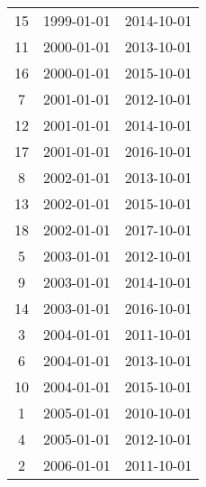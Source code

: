 % 
\begin{tabular}{ccc}
  \hline
  \hline
15 & 1999-01-01 & 2014-10-01 \\ 
  11 & 2000-01-01 & 2013-10-01 \\ 
  16 & 2000-01-01 & 2015-10-01 \\ 
  7 & 2001-01-01 & 2012-10-01 \\ 
  12 & 2001-01-01 & 2014-10-01 \\ 
  17 & 2001-01-01 & 2016-10-01 \\ 
  8 & 2002-01-01 & 2013-10-01 \\ 
  13 & 2002-01-01 & 2015-10-01 \\ 
  18 & 2002-01-01 & 2017-10-01 \\ 
  5 & 2003-01-01 & 2012-10-01 \\ 
  9 & 2003-01-01 & 2014-10-01 \\ 
  14 & 2003-01-01 & 2016-10-01 \\ 
  3 & 2004-01-01 & 2011-10-01 \\ 
  6 & 2004-01-01 & 2013-10-01 \\ 
  10 & 2004-01-01 & 2015-10-01 \\ 
  1 & 2005-01-01 & 2010-10-01 \\ 
  4 & 2005-01-01 & 2012-10-01 \\ 
  2 & 2006-01-01 & 2011-10-01 \\ 
   \hline
\end{tabular}
